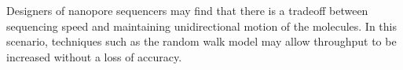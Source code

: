 \documentclass[12pt]{article}
\begin{document}
Designers of nanopore sequencers may find that there is a tradeoff between sequencing speed and maintaining unidirectional motion of the molecules. In this scenario, techniques such as the random walk model may allow throughput to be increased without a loss of accuracy.








\end{document}
